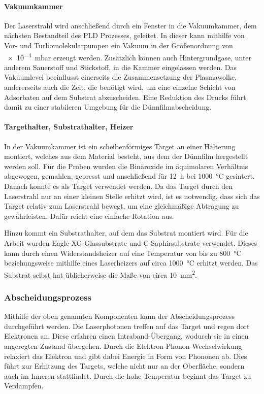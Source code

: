 \paragraph{Vakuumkammer}
Der Laserstrahl wird anschließend durch ein Fenster in die Vakuumkammer, dem nächsten Bestandteil des PLD Prozesses,
geleitet.
In dieser kann mithilfe von Vor- und Turbomolekularpumpen ein Vakuum in der Größenordnung von
\qty{e-4}{\milli\bar} erzeugt werden.
Zusätzlich können auch Hintergrundgase, unter anderem Sauerstoff und Stickstoff, in die Kammer eingelassen werden.
Das Vakuumlevel beeinflusst einerseits die Zusammensetzung der Plasmawolke, andererseits auch die
Zeit, die benötigt wird, um eine einzelne Schicht von Adsorbaten auf dem Substrat abzuscheiden.
Eine Reduktion des Drucks führt damit zu einer stabileren Umgebung für die Dünnfilmabscheidung.\autocite[2297-2298]{pld}

\paragraph{Targethalter, Substrathalter, Heizer}
In der Vakuumkammer ist ein scheibenförmiges Target an einer Halterung montiert, welches aus dem Material besteht, aus
dem der Dünnfilm hergestellt werden soll.
Für die \heo Proben wurden die Binäroxide im äquimolaren Verhältnis abgewogen, gemahlen, gepresst und anschließend
für \qty{12}{\hour} bei \qty{1000}{\celsius} gesintert.
Danach konnte es als Target verwendet werden.
Da das Target durch den Laserstrahl nur an einer kleinen Stelle erhitzt wird, ist es notwendig,
dass sich das Target relativ zum Laserstrahl bewegt, um eine gleichmäßige Abtragung zu gewährleisten.
Dafür reicht eine einfache Rotation aus.

Hinzu kommt ein Substrathalter, auf dem das Substrat montiert wird.
Für die Arbeit wurden Eagle-XG-Glassubstrate und C-Saphirsubstrate verwendet.
Dieses kann durch einen Widerstandsheizer auf eine Temperatur von bis zu \qty{800}{\celsius} beziehungsweise
mithilfe eines Laserheizers auf circa \qty{1000}{\celsius} erhitzt werden.
Das Substrat selbst hat üblicherweise die Maße von circa \qty{10}{\milli\meter\squared}.

\autocite[2299]{pld}

\subsubsection{Abscheidungsprozess}
Mithilfe der oben genannten Komponenten kann der Abscheidungsprozess durchgeführt werden.
Die Laserphotonen treffen auf das Target und regen dort Elektronen an.
Diese erfahren einen Intraband-Übergang, wodurch sie in einen angeregten Zustand übergehen.
Durch die Elektron-Phonon-Wechselwirkung relaxiert das Elektron und gibt dabei Energie in Form von Phononen ab.
Dies führt zur Erhitzung des Targets, welche nicht nur an der Oberfläche, sondern auch im Inneren stattfindet.
Durch die hohe Temperatur beginnt das Target zu Verdampfen.

